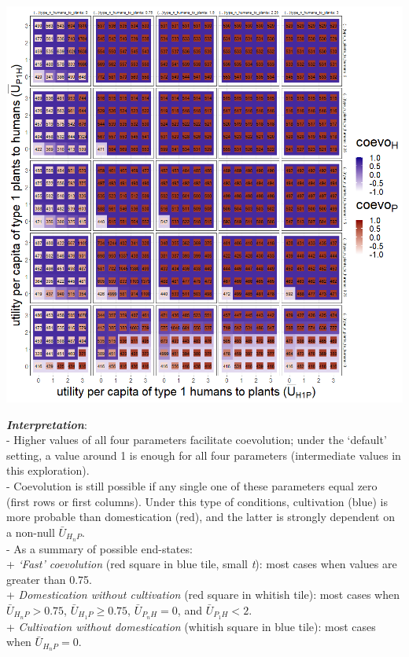 \documentclass[
]{book}
\begin{document}
\newpage

\includegraphics[width=1\linewidth]{plots/4_exp_utilities_between_populations-tripleRaster_fourParameterss}

\textbf{\emph{Interpretation}}:\\
- Higher values of all four parameters facilitate coevolution; under the `default' setting, a value around 1 is enough for all four parameters (intermediate values in this exploration).\\
- Coevolution is still possible if any single one of these parameters equal zero (first rows or first columns). Under this type of conditions, cultivation (blue) is more probable than domestication (red), and the latter is strongly dependent on a non-null \(\bar{U}_{H_{n}P}\).\\
- As a summary of possible end-states:\\
+ \emph{`Fast' coevolution} (red square in blue tile, small \emph{t}): most cases when values are greater than 0.75.\\
+ \emph{Domestication without cultivation} (red square in whitish tile): most cases when \(\bar{U}_{H_{n}P}>0.75\), \(\bar{U}_{H_{1}P}\geq 0.75\), \(\bar{U}_{P_{n}H}=0\), and \(\bar{U}_{P_{1}H}<2\).\\
+ \emph{Cultivation without domestication} (whitish square in blue tile): most cases when \(\bar{U}_{H_{n}P} = 0\).
\end{document}
